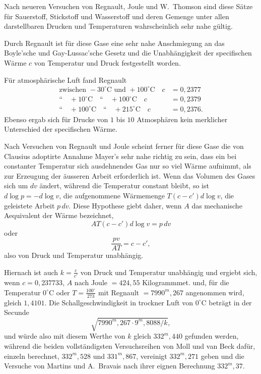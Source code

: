 \documentclass[12pt,a4paper]{book}
\theoremstyle{definition}
\theoremstyle{remark}
\begin{document}
Nach neueren Versuchen von Regnault, Joule und W.~Thomson sind diese S\"atze f\"ur Sauerstoff, Stickstoff und Wasserstoff und deren Gemenge unter allen darstellbaren Drucken und Temperaturen wahrscheinlich sehr nahe g\"ultig.

Durch Regnault ist f\"ur diese Gase eine sehr nahe Anschmiegung an das Boyle'sche und Gay-Lussac'sche Gesetz und die Unabh\"angigkeit der specifischen W\"arme $c$ von Temperatur und Druck festgestellt worden.

F\"ur atmosph\"arische Luft fand Regnault
\begin{align*}
\text{zwischen } -30^{\circ}\text{C und } +100^{\circ}\text{C} \quad c &= 0{,}2377\\
\text{``}\quad +10^{\circ}\text{C}\quad\text{``}\quad +100^{\circ}\text{C} \quad c &= 0{,}2379\\
\text{``}\quad +100^{\circ}\text{C}\quad\text{``}\quad +215^{\circ}\text{C} \quad c &= 0{,}2376.
\end{align*}
Ebenso ergab sich f\"ur Drucke von $1$ bis $10$ Atmosph\"aren kein merklicher Unterschied der specifischen W\"arme.

Nach Versuchen von Regnault und Joule scheint ferner f\"ur diese Gase die von Clausius adoptirte Annahme Mayer's sehr nahe richtig zu sein, dass ein bei constanter Temperatur sich ausdehnendes Gas nur so viel W\"arme aufnimmt, als zur Erzeugung der \"ausseren Arbeit erforderlich ist. Wenn das Volumen des Gases sich um $dv$ \"andert, w\"ahrend die Temperatur constant bleibt, so ist $d\log p = -d\log v$, die aufgenommene W\"armemenge $T(c-c')d\log v$, die geleistete Arbeit $p\,dv$. Diese Hypothese giebt daher, wenn $A$ das mechanische Aequivalent der W\"arme bezeichnet,
\[
AT(c-c')d\log v = p\,dv
\]
oder
\[
\frac{pv}{AT} = c - c',
\]
also von Druck und Temperatur unabh\"angig.

Hiernach ist auch $k = \frac{c}{c'}$ von Druck und Temperatur unabh\"angig und ergiebt sich, wenn $c = 0{,}237733$, $A$ nach Joule $= 424{,}55$ Kilogrammmet. und, f\"ur die Temperatur $0^{\circ}$C oder $T = \frac{100^{\circ}}{273}$ mit Regnault $= 7990^{m},267$ angenommen wird, gleich $1{,}4101$. Die Schallgeschwindigkeit in trockner Luft von $0^{\circ}$C betr\"agt in der Secunde
\[
\sqrt{7990^{m},267 \cdot 9^{m},8088/k},
\]
und w\"urde also mit diesem Werthe von $k$ gleich $332^{m},440$ gefunden werden, w\"ahrend die beiden vollst\"andigsten Versuchsreihen von Moll und van Beck daf\"ur, einzeln berechnet, $332^{m},528$ und $331^{m},867$, vereinigt $332^{m},271$ geben und die Versuche von Martins und A.~Bravais nach ihrer eignen Berechnung $332^{m},37$.
\end{document}

